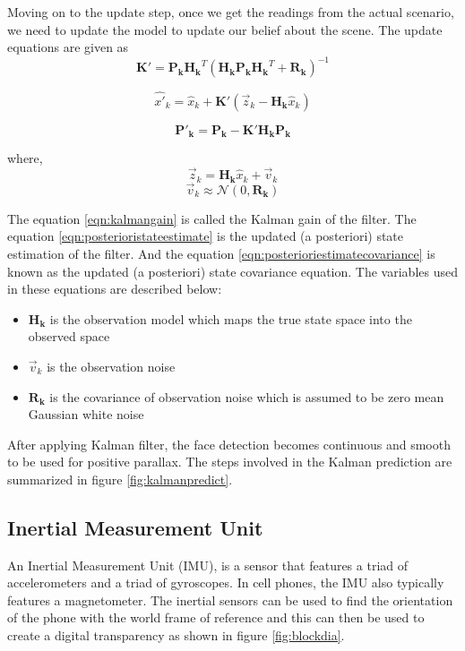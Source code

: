 \documentclass[12pt,twocolumn,letterpaper]{article}
\begin{document}
Moving on to the update step, once we get the readings from the actual scenario, we need to update the model to update our belief about the scene. The update equations are given as
\begin{equation}
\label{eqn:kalmangain}
\mathbf{K'} = \mathbf{P_k} \mathbf{H_k}^T \left( \mathbf{H_k} \mathbf{P_k} \mathbf{H_k}^T + \mathbf{R_k} \right)^{-1}
\end{equation}

\begin{equation}
\hat{x'}_k = \hat{x}_k + \mathbf{K'} \left( \vec{z}_k - \mathbf{H_k} \hat{x}_k \right)
\label{eqn:posterioristateestimate}
\end{equation}

\begin{equation}
\mathbf{P'_k} = \mathbf{P_k} - \mathbf{K'}  \mathbf{H_k} \mathbf{P_k}
\label{eqn:posterioriestimatecovariance}
\end{equation}

where,
$$ \vec{z}_k = \mathbf{H_k} \hat{x}_k + \vec{v}_k$$
$$ \vec{v}_k \approx \mathcal{N}(0, \mathbf{R_k})$$

The equation \ref{eqn:kalmangain} is called the Kalman gain of the filter. The equation \ref{eqn:posterioristateestimate} is the updated (a posteriori) state estimation of the filter. And the equation \ref{eqn:posterioriestimatecovariance} is known as the updated (a posteriori) state covariance equation. The variables used in these equations are described below:

\begin{itemize}
\item $\mathbf{H_k}$ is the observation model which maps the true state space into the observed space
\item $\vec{v}_k$ is the observation noise
\item $\mathbf{R_k}$ is the covariance of observation noise which is assumed to be zero mean Gaussian white noise
\end{itemize}

After applying Kalman filter, the face detection becomes continuous and smooth to be used for positive parallax. The steps involved in the Kalman prediction are summarized in figure \ref{fig:kalmanpredict}.

\subsection{Inertial Measurement Unit}
An Inertial Measurement Unit (IMU), is a sensor that features a triad of accelerometers and a triad of gyroscopes.  In cell phones, the IMU also typically features a magnetometer. The inertial sensors can be used to find the orientation of the phone with the world frame of reference and this can then be used to create a digital transparency as shown in figure \ref{fig:blockdia}.
\end{document}

